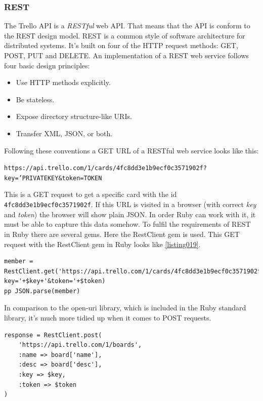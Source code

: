 \subsubsection{REST}
The Trello API is a \emph{RESTful} web API. That means that the API is conform to the REST design model. REST is a common style of software architecture for distributed systems. It's built on four of the HTTP request methods: GET, POST, PUT and DELETE. An implementation of a REST web service follows four basic design principles:
\begin{itemize}
	\item Use HTTP methods explicitly.
	\item Be stateless.
	\item Expose directory structure-like URIs.
	\item Transfer XML, JSON, or both.
\end{itemize}
\cite{rest}

Following these conventions a GET URL of a RESTful web service looks like this:
\begin{center}
\texttt{https://api.trello.com/1/cards/4fc8dd3e1b9ecf0c3571902f? key='PRIVATEKEY\&token=TOKEN}
\end{center}
This is a GET request to get a specific card with the id \texttt{4fc8dd3e1b9ecf0c3571902f}. If this URL is visited in a browser (with correct \emph{key} and \emph{token}) the browser will show plain JSON. In order Ruby can work with it, it must be able to capture this data somehow. To fulfil the requirements of REST in Ruby there are several gems. Here the RestClient gem is used. This GET request with the RestClient gem in Ruby looks like \ref{listing019}.

\begin{lstlisting}[aboveskip=1\baselineskip, caption=GET request using RestClient., label=listing019]
member = RestClient.get('https://api.trello.com/1/cards/4fc8dd3e1b9ecf0c3571902f?key='+$key+'&token='+$token)
pp JSON.parse(member)
\end{lstlisting}

In comparison to the open-uri library, which is included in the Ruby standard library, it's much more tidied up when it comes to POST requests.

\begin{lstlisting}[aboveskip=1\baselineskip, caption=POST request using RestClient., label=listing009]
response = RestClient.post(
	'https://api.trello.com/1/boards',
	:name => board['name'], 
	:desc => board['desc'],
	:key => $key,
	:token => $token
)
\end{lstlisting}

